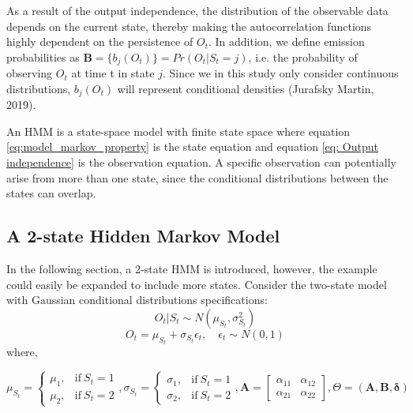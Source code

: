 As a result of the output independence, the distribution of the observable data depends on the current state, thereby making the autocorrelation functions highly dependent on the persistence of $O_t$. In addition, we define emission probabilities as $\mathbf{B}=\{ b_j(O_t) \}=Pr(O_t|S_t=j)$, i.e. the probability of observing $O_t$ at time t in state $j$. Since we in this study only consider continuous distributions, $b_j(O_t)$ will represent conditional densities (Jurafsky Martin, 2019).

An HMM is a state-space model with finite state space where equation \ref{eq:model_markov_property} is the state equation and equation \ref{eq: Output independence} is the observation equation. A specific observation can potentially arise from more than one state, since the conditional distributions between the states can overlap.

\subsection{A 2-state Hidden Markov Model}

In the following section, a 2-state HMM is introduced, however, the example could easily be expanded to include more states. Consider the two-state model with Gaussian conditional distributions specifications:
\begin{equation}
     O_t|S_t \sim N(\mu_{S_t},\sigma^2_{S_t}) 
\end{equation}
\begin{equation}
   O_t = \mu_{S_t}  + \sigma_{S_t}\epsilon_{t}
   ,\quad \epsilon_{t} \sim N(0,1)   
\end{equation}
where,

$$
    \mu_{S_t}=
    \begin{cases}
        \mu_1, & \text{if}\ S_t = 1 \\
        \mu_2, & \text{if}\ S_t = 2
    \end{cases},
    \sigma_{S_t} =
    \begin{cases}
        \sigma_1, & \text{if}\ S_t = 1 \\
        \sigma_2, & \text{if}\ S_t = 2
    \end{cases},
    \mathbf{A} = 
    \begin{bmatrix}
    \alpha_{11} & \alpha_{12} \\
    \alpha_{21} & \alpha_{22}
    \end{bmatrix},
    \Theta = (\mathbf{A}, \mathbf{B}, \boldsymbol{\delta})
$$

